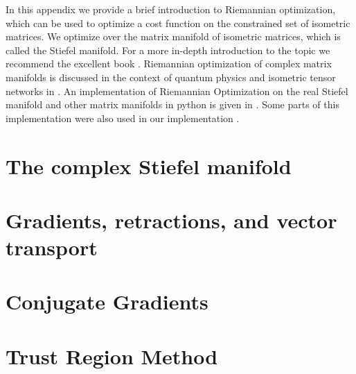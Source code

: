 In this appendix we provide a brief introduction to Riemannian optimization, which can be used to optimize a cost function on the constrained set of isometric matrices. We optimize over the matrix manifold of isometric matrices, which is called the Stiefel manifold. For a more in-depth introduction to the topic we recommend the excellent book \cite{cite:optimization_on_matrix_manifolds}. Riemannian optimization of complex matrix manifolds is discussed in the context of quantum physics and isometric tensor networks in \cite{cite:riemannian_geometry_automatic_differentiation_quantum_physics, cite:riemannian_optimization_isometric_tensor_networks}. An implementation of Riemannian Optimization on the real Stiefel manifold and other matrix manifolds in python is given in \cite{cite:pymanopt}. Some parts of this implementation were also used in our implementation \cite{cite:github_YB_isoTPS}.

\section{The complex Stiefel manifold}
\label{sec:the_complex_stiefel_manifold}


\section{Gradients, retractions, and vector transport}
\label{sec:gradients_retractions_vector_transport}


\section{Conjugate Gradients}
\label{sec:conjugate_gradients}


\section{Trust Region Method}
\label{sec:trust_region_method}
